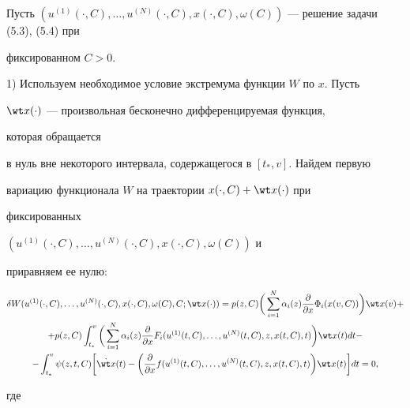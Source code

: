 \begin{pf} 


Пусть $(u^{(1)}(\cdot,C),\dotsc,u^{(N)}(\cdot,C),x(\cdot,C), 


\omega(C))$ --- решение задачи (5.3), (5.4) при 


фиксированном $C>0$. 


 


1) Используем необходимое условие экстремума функции $W$ по $x$. Пусть 


$\wt x(\cdot)$ --- произвольная бесконечно дифференцируемая функция, 


которая обращается 


в нуль вне некоторого интервала, содержащегося в $[t_*,v]$. Найдем первую 


вариацию функционала $W$ на траектории $x(\cdot,C)+\wt x(\cdot)$ при 


фиксированных 


$(u^{(1)}(\cdot,C),\dotsc,u^{(N)}(\cdot,C),x(\cdot,C),\omega(C))$ и 


приравняем ее нулю: 


\begin{gather*} 


\delta W(u^{(1)}(\cdot,C),\dotsc,u^{(N)}(\cdot,C), 


x(\cdot,C),\omega(C),C;\wt x(\cdot))=p(z,C)\bigg( 


\sum^N_{i=1}\alpha_i(z)\frac{\partial}{\partial x}\Phi_i 


(x(v,C))\bigg)\wt x(v)+ \\ 


+p(z,C)\int^v_{t_*}\bigg(\sum^N_{i=1}\alpha_i(z) 


\frac{\partial}{\partial x}F_i 


(u^{(1)}(t,C),\dotsc,u^{(N)}(t,C),z,x(t,C),t)\bigg) 


\wt x(t)dt- \\ 


-\int^v_{t_*}\psi(z,t,C)\bigg[\Dot{\wt x}(t)-\bigg( 


\frac{\partial}{\partial x}f 


(u^{(1)}(t,C),\dotsc,u^{(N)}(t,C),z,x(t,C),t)\bigg)\wt x(t) 


\bigg]dt=0, 


\end{gather*} 


где 


\begin{gather*} 



\end{gather*}
\end{pf}
